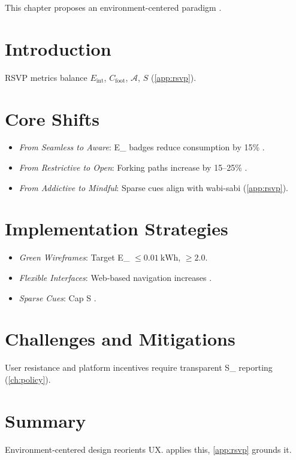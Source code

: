 \documentclass[openany]{book}
\newcommand{\Sent}{S} %
\newcommand{\Eint}{E_{\mathrm{int}}} %
\newcommand{\Cfoot}{C_{\mathrm{foot}}} %
\newcommand{\Auton}{\mathcal{A}} %
\newcommand{\SUX}{S_{\mathrm{UX}}} %
\newcommand{\kWh}{\mathrm{kWh}}
\begin{document}
This chapter proposes an environment-centered paradigm \citep{colak2024,doctorow2022}.

\section{Introduction}
\label{sec:paradigm-intro}
RSVP metrics balance \(\Eint\), \(\Cfoot\), \(\Auton\), \(\Sent\) (\cref{app:rsvp}).

\section{Core Shifts}
\label{sec:paradigm-shifts}
\begin{itemize}
  \item \emph{From Seamless to Aware}: \Eint{} badges reduce consumption by 15\% \citep{colak2024}.
  \item \emph{From Restrictive to Open}: Forking paths increase \Auton{} by 15--25\% \citep{doctorow2022}.
  \item \emph{From Addictive to Mindful}: Sparse cues align with wabi-sabi (\cref{app:rsvp}).
\end{itemize}

\section{Implementation Strategies}
\label{sec:paradigm-strategies}
\begin{itemize}
  \item \emph{Green Wireframes}: Target \Eint{} \(\leq \SI{0.01}{\kWh}\), \Auton{} \(\geq 2.0\).
  \item \emph{Flexible Interfaces}: Web-based navigation increases \Auton{}.
  \item \emph{Sparse Cues}: Cap \Sent{} \citep{colak2024}.
\end{itemize}

\section{Challenges and Mitigations}
\label{sec:paradigm-challenges}
User resistance and platform incentives require transparent \SUX{} reporting (\cref{ch:policy}).

\section{Summary}
Environment-centered design reorients UX.  applies this, \cref{app:rsvp} grounds it.
\end{document}
